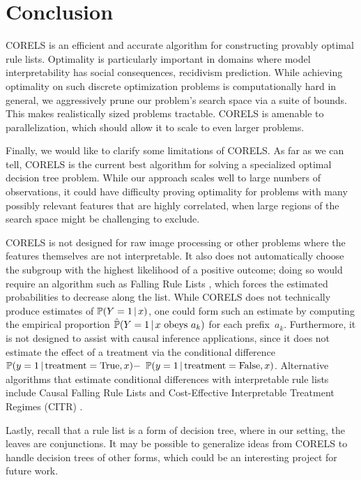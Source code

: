 \section{Conclusion}

CORELS is an efficient and accurate algorithm for constructing provably optimal rule lists.
%
Optimality is particularly important in domains where model interpretability
has social consequences, \eg recidivism prediction.
%
While achieving optimality on such discrete optimization problems is
computationally hard in general, we aggressively prune our problem's search space
via a suite of bounds.
%
This makes realistically sized problems tractable.
%
CORELS is amenable to parallelization, which should allow it to scale to
even larger problems.

\begin{arxiv}
Finally, we would like to clarify some limitations of CORELS.
%
As far as we can tell, CORELS is the current best algorithm for solving a
specialized optimal decision tree problem.
%
While our approach scales well to large numbers of observations,
it could have difficulty proving optimality
for problems with many possibly relevant features that are highly correlated,
when large regions of the search space might be challenging to exclude.

CORELS is not designed for raw image processing or other problems where the features
themselves are not interpretable.
%
It also does not automatically choose the subgroup with the highest likelihood of a
positive outcome; doing so would require an algorithm such as Falling Rule Lists \citep{WangRu15},
which forces the estimated probabilities to decrease along the list.
%
While CORELS does not technically produce estimates of ${\mathbb{P}(Y=1 \,|\, x)}$,
one could form such an estimate by computing the empirical
proportion ${\hat{\mathbb{P}}(Y=1 \,|\, x \textrm{ obeys } a_k)}$ for each prefix~$a_k$.
%
Furthermore, it is not designed to assist with causal inference applications, since
it does not estimate the effect of a treatment via the conditional difference
${\mathbb{P}(y=1 \,|\, \textrm{treatment} = \textrm{True}, x) -}$ ${\mathbb{P}(y=1 \,|\, \textrm{treatment} = \textrm{False}, x)}$.
%
Alternative algorithms that estimate conditional differences with interpretable
rule lists include Causal Falling Rule Lists \citep{WangRu16}
and Cost-Effective Interpretable Treatment Regimes (CITR) \citep{LakkarajuRu17}.

Lastly, recall that a rule list is a form of decision tree,
where in our setting, the leaves are conjunctions.
%
It may be possible to generalize ideas from CORELS to handle decision trees of
other forms, which could be an interesting project for future work.
\end{arxiv}

